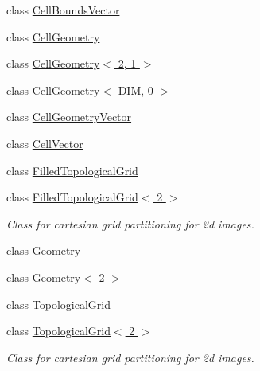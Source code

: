 \begin{DoxyCompactItemize}
\item 
class \hyperlink{classnifty_1_1cgp_1_1CellBoundsVector}{Cell\+Bounds\+Vector}
\item 
class \hyperlink{classnifty_1_1cgp_1_1CellGeometry}{Cell\+Geometry}
\item 
class \hyperlink{classnifty_1_1cgp_1_1CellGeometry_3_012_00_011_01_4}{Cell\+Geometry$<$ 2, 1 $>$}
\item 
class \hyperlink{classnifty_1_1cgp_1_1CellGeometry_3_01DIM_00_010_01_4}{Cell\+Geometry$<$ D\+I\+M, 0 $>$}
\item 
class \hyperlink{classnifty_1_1cgp_1_1CellGeometryVector}{Cell\+Geometry\+Vector}
\item 
class \hyperlink{classnifty_1_1cgp_1_1CellVector}{Cell\+Vector}
\item 
class \hyperlink{classnifty_1_1cgp_1_1FilledTopologicalGrid}{Filled\+Topological\+Grid}
\item 
class \hyperlink{classnifty_1_1cgp_1_1FilledTopologicalGrid_3_012_01_4}{Filled\+Topological\+Grid$<$ 2 $>$}
\begin{DoxyCompactList}\small\item\em Class for cartesian grid partitioning for 2d images. \end{DoxyCompactList}\item 
class \hyperlink{classnifty_1_1cgp_1_1Geometry}{Geometry}
\item 
class \hyperlink{classnifty_1_1cgp_1_1Geometry_3_012_01_4}{Geometry$<$ 2 $>$}
\item 
class \hyperlink{classnifty_1_1cgp_1_1TopologicalGrid}{Topological\+Grid}
\item 
class \hyperlink{classnifty_1_1cgp_1_1TopologicalGrid_3_012_01_4}{Topological\+Grid$<$ 2 $>$}
\begin{DoxyCompactList}\small\item\em Class for cartesian grid partitioning for 2d images. \end{DoxyCompactList}\end{DoxyCompactItemize}
